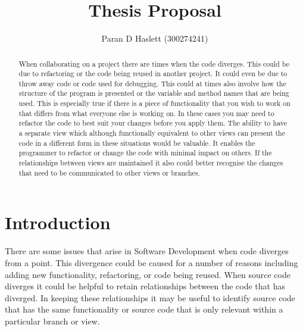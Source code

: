 \documentclass[12pt]{CRPITStyle}
\begin{document}
\title{Thesis Proposal}
\author{Paran D Haslett (300274241)}
\maketitle

\begin{abstract}
When collaborating on a project there are times when the code diverges. This could be due to refactoring or the code being reused in another project. It could even be due to throw away code or code used for debugging. This could at times also involve how the structure of the program is presented or the variable and method names that are being used. This is especially true if there is a piece of functionality that you wish to work on that differs from what everyone else is working on. In these cases you may need to refactor the code to best suit your changes before you apply them. The ability to have a separate view which although functionally equivalent to other views can present the code in a different form in these situations would be valuable. It enables the programmer to refactor or change the code with minimal impact on others. If the relationships between views are maintained it also could better recognise the changes that need to be communicated to other views or branches.
\end{abstract}
\vspace{.1in}


\section{Introduction}
There are some issues that arise in Software Development when code diverges from a point. This divergence could be caused for a number of reasons including adding new functionality, refactoring, or code being reused. When source code diverges it could be helpful to retain relationships between the code that has diverged. In keeping these relationships it may be useful to identify source code that has the same functionality or source code that is only relevant within a particular branch or view. 
\end{document}
